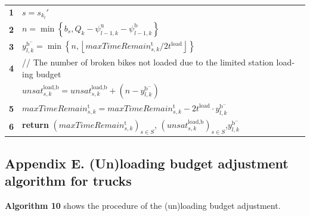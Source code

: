 \documentclass[
  english,
]{article}
\newcounter{none} %
\begin{document}
\begin{otherlanguage}{english}
\protect{}\label{t0070}
{\def\LTcaptype{none} %
\begin{longtable}[]{@{}ll@{}}
\toprule\noalign{}
\multicolumn{2}{@{}l@{}}{%
\textbf{Algorithm 9:}
\(assignLoadB\left( {r_{k}',l,\left( {\mathit{maxTimeRemai}n_{s,k}^{\text{t}}} \right)_{s \in S},\left( {\mathit{unsa}t_{s,k}^{\text{load},\text{b}}} \right)_{s \in S}} \right)\)} \\
\midrule\noalign{}
\endhead
\bottomrule\noalign{}
\endlastfoot
\textbf{1} & \(s = s_{k_{l}}'\) \\
\textbf{2} &
\(n = \min\left\{ \left. {b_{s},Q_{k} - \psi_{l - 1,k}^{\text{u}} - \psi_{l - 1,k}^{\text{b}}} \right\} \right.\) \\
\textbf{3} &
\(y_{l,k}^{\text{b}^{-}} = \min\left\{ \left. {n,\left\lfloor \mathit{maxTimeRemai}n_{s,k}^{\text{t}}/2t^{\text{load}} \right\rfloor} \right\} \right.\) \\
\textbf{4} & // The number of broken bikes not loaded due to the limited station loading budget \\
&
\(\mathit{unsa}t_{s,k}^{\text{load,b}} = unsat_{s,k}^{\text{load,b}} + \left( {n - y_{l,k}^{\text{b}^{-}}} \right)\) \\
\textbf{5} &
\(\mathit{maxTimeRemai}n_{s,k}^{\text{t}} = maxTimeRemain_{s,k}^{\text{t}} - 2t^{\text{load}} \cdot y_{l,k}^{\text{b}^{-}}\) \\
\textbf{6} & \textbf{return} \(\left( {\mathit{maxTimeRemai}n_{s,k}^{\text{t}}} \right)_{s \in S}\),
\(\left( {\mathit{unsa}t_{s,k}^{\text{load},\text{b}}} \right)_{s \in S}\),\(y_{l,k}^{\text{b}^{-}}\) \\
\end{longtable}
}

\protect{}\label{s0165}
\subsection{Appendix E. (Un)loading budget adjustment algorithm for trucks}\label{st195}

\protect{}\label{p0805}
\textbf{Algorithm 10} shows the procedure of the (un)loading budget adjustment.


\end{otherlanguage}
\end{document}
